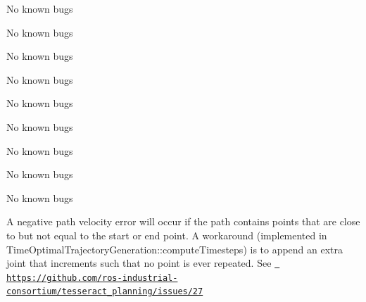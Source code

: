 \begin{DoxyRefList}
\label{bug__bug000256}%
%
No known bugs

\label{bug__bug000225}%
%
No known bugs

\label{bug__bug000255}%
%
No known bugs 
\item[File \doxylink{taskflow__task__composer__executor_8h}{taskflow\+\_\+task\+\_\+composer\+\_\+executor.h} ]\label{bug__bug000289}%
%
No known bugs 
\item[File \doxylink{taskflow__task__composer__future_8cpp}{taskflow\+\_\+task\+\_\+composer\+\_\+future.cpp} ]\label{bug__bug000293}%
%
No known bugs 
\item[File \doxylink{taskflow__task__composer__future_8h}{taskflow\+\_\+task\+\_\+composer\+\_\+future.h} ]\label{bug__bug000290}%
%
No known bugs 
\item[File \doxylink{taskflow__task__composer__plugin__factories_8h}{taskflow\+\_\+task\+\_\+composer\+\_\+plugin\+\_\+factories.h} ]\label{bug__bug000291}%
%
No known bugs 
\item[File \doxylink{tesseract__common__trajectory_8cpp}{tesseract\+\_\+common\+\_\+trajectory.cpp} ]\label{bug__bug000301}%
%
No known bugs 
\item[File \doxylink{tesseract__common__trajectory_8h}{tesseract\+\_\+common\+\_\+trajectory.h} ]\label{bug__bug000297}%
%
No known bugs 
\item[Member \doxylink{classtesseract__planning_1_1totg_1_1Trajectory_a78d9b62367b7178b2d23eaf185969319}{tesseract\+\_\+planning\+::totg\+::Trajectory\+::Trajectory} (const \doxylink{classtesseract__planning_1_1totg_1_1Path}{Path} \&path, const Eigen\+::\+Vector\+Xd \&max\+\_\+velocity, const Eigen\+::\+Vector\+Xd \&max\+\_\+acceleration, double time\+\_\+step=0.\+001)]\label{bug__bug000304}%
%
A negative path velocity error will occur if the path contains points that are close to but not equal to the start or end point. A workaround (implemented in Time\+Optimal\+Trajectory\+Generation\+::compute\+Timesteps) is to append an extra joint that increments such that no point is ever repeated. See \href{https://github.com/ros-industrial-consortium/tesseract_planning/issues/27}{\texttt{ https\+://github.\+com/ros-\/industrial-\/consortium/tesseract\+\_\+planning/issues/27}}  
\item[File \doxylink{test__task_8cpp}{test\+\_\+task.cpp} ]\label{bug__bug000226}%

\end{DoxyRefList}
